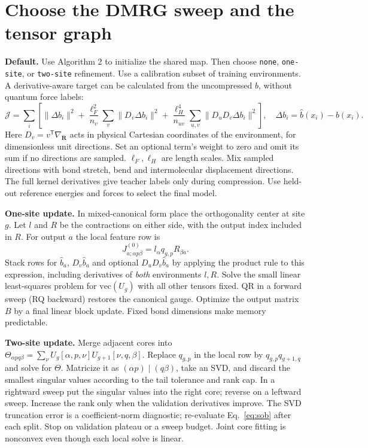 \documentclass[11pt,a4paper]{article}
\newcommand{\T}{\mathsf T}\newcommand{\tr}{\operatorname{tr}}
\begin{document}
\pg\section{Choose the DMRG sweep and the tensor graph}
\textbf{Default.} Use Algorithm 2 to initialize the shared map. Then choose \texttt{none}, \texttt{one-site}, or \texttt{two-site} refinement. Use a calibration subset of training environments. A derivative-aware target can be calculated from the uncompressed $b$, without quantum force labels:
\begin{equation}
 \mathcal J=\sum_i\!\left[
 \|\Delta b_i\|^2+
  \frac{\ell_F^2}{n_v}\sum_v\|D_v\Delta b_i\|^2+
  \frac{\ell_H^4}{n_{uv}}\sum_{u,v}\|D_uD_v\Delta b_i\|^2
 \right],\quad \Delta b_i=\widehat b(x_i)-b(x_i).
 \label{eq:sob}
\end{equation}
Here $D_v=v^\T\nabla_{\mathbf R}$ acts in physical Cartesian coordinates of the environment, for dimensionless unit directions. Set an optional term's weight to zero and omit its sum if no directions are sampled. $\ell_F,\ell_H$ are length scales. Mix sampled directions with bond stretch, bend and intermolecular displacement directions. The full kernel derivatives give teacher labels only during compression. Use held-out reference energies and forces to select the final model.

\textbf{One-site update.} In mixed-canonical form place the orthogonality center at site $g$. Let $l$ and $R$ be the contractions on either side, with the output index included in $R$. For output $a$ the local feature row is
\[
 J^{(0)}_{a;\alpha p\beta}=l_\alpha q_{g,p} R_{\beta a}.
\]
Stack rows for $\widehat b_a$, $D_v\widehat b_a$ and optional $D_uD_v\widehat b_a$ by applying the product rule to this expression, including derivatives of \emph{both} environments $l,R$. Solve the small linear least-squares problem for $\mathrm{vec}(U_g)$ with all other tensors fixed. QR in a forward sweep (RQ backward) restores the canonical gauge. Optimize the output matrix $B$ by a final linear block update. Fixed bond dimensions make memory predictable.

\textbf{Two-site update.} Merge adjacent cores into $\Theta_{\alpha p q\beta}=\sum_\nu U_g[\alpha,p,\nu]U_{g+1}[\nu,q,\beta]$. Replace $q_{g,p}$ in the local row by $q_{g,p}q_{g+1,q}$ and solve for $\Theta$. Matricize it as $(\alpha p)\mid(q\beta)$, take an SVD, and discard the smallest singular values according to the tail tolerance and rank cap. In a rightward sweep put the singular values into the right core; reverse on a leftward sweep. Increase the rank only when the validation derivatives improve. The SVD truncation error is a coefficient-norm diagnostic; re-evaluate Eq.~\eqref{eq:sob} after each split. Stop on validation plateau or a sweep budget. Joint core fitting is nonconvex even though each local solve is linear.
\end{document}
